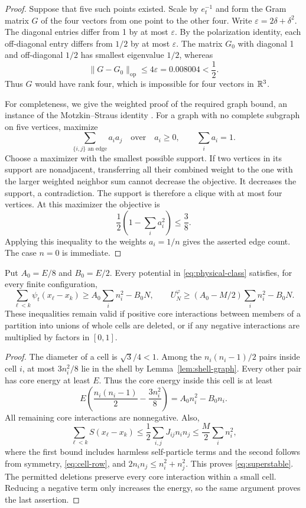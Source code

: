 \begin{proof}
Suppose that five such points existed. Scale by $e_t^{-1}$ and form the
Gram matrix $G$ of the four vectors from one point to the other four.
Write $\varepsilon=2\delta+\delta^2$. The diagonal entries differ
from 1 by at most $\varepsilon$. By the polarization identity, each
off-diagonal entry differs from $1/2$ by at most $\varepsilon$.
The matrix $G_0$ with diagonal 1 and off-diagonal $1/2$ has smallest
eigenvalue $1/2$, whereas
\[
 \|G-G_0\|_{\mathrm{op}}\le4\varepsilon
 =0.008004<\frac12.
\]
Thus $G$ would have rank four, which is impossible for four vectors
in $\mathbb R^3$.

For completeness, we give the weighted proof of the required graph bound,
an instance of the Motzkin--Straus identity
\cite[Theorem~1]{MotzkinStraus1965}.
For a graph with no complete subgraph on five vertices, maximize
\[
 \sum_{\{i,j\}\text{ an edge}}a_i a_j
 \quad\text{over}\quad a_i\ge0,\qquad\sum_i a_i=1.
\]
Choose a maximizer with the smallest possible support. If two vertices
in its support are nonadjacent, transferring all their combined weight
to the one with the larger weighted neighbor sum cannot decrease the
objective. It decreases the support, a contradiction. The support is
therefore a clique with at most four vertices. At this maximizer the
objective is
\[
 \frac12\left(1-\sum_i a_i^2\right)\le\frac38.
\]
Applying this inequality to the weights $a_i=1/n$ gives the asserted
edge count. The case $n=0$ is immediate.
\end{proof}

\begin{proposition}
\label{prop:stability}
Put $A_0=E/8$ and $B_0=E/2$. Every potential in
\eqref{eq:physical-class} satisfies, for every finite configuration,
\begin{equation}
 \sum_{\ell<k}\psi_t(x_\ell-x_k)
 \ge A_0\sum_i n_i^2-B_0N,
 \qquad
 U_N^\varphi\ge (A_0-M/2)\sum_i n_i^2-B_0N.
 \label{eq:superstable}
\end{equation}
These inequalities remain valid if positive core interactions between
members of a partition into unions of whole cells are deleted, or if
any negative interactions are multiplied by factors in $[0,1]$.
\end{proposition}

\begin{proof}
The diameter of a cell is $\sqrt3/4<1$. Among the $n_i(n_i-1)/2$
pairs inside cell $i$, at most $3n_i^2/8$ lie in the shell by
Lemma~\ref{lem:shell-graph}. Every other pair has core energy at
least $E$. Thus the core energy inside this cell is at least
\[
 E\left(\frac{n_i(n_i-1)}2-\frac{3n_i^2}8\right)
 =A_0 n_i^2-B_0 n_i.
\]
All remaining core interactions are nonnegative. Also,
\[
 \sum_{\ell<k}S(x_\ell-x_k)
 \le\frac12\sum_{i,j}J_{ij}n_i n_j
 \le\frac M2\sum_i n_i^2,
\]
where the first bound includes harmless self-particle terms and the
second follows from symmetry, \eqref{eq:cell-row}, and
$2n_i n_j\le n_i^2+n_j^2$. This proves
\eqref{eq:superstable}. The permitted deletions preserve every core
interaction within a small cell. Reducing a negative term only
increases the energy, so the same argument proves the last assertion.
\end{proof}

